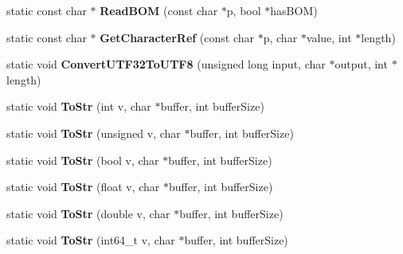 \begin{DoxyCompactItemize}
\item 
static const char $\ast$ {\bfseries Read\+B\+OM} (const char $\ast$p, bool $\ast$has\+B\+OM)\hypertarget{classtinyxml2_1_1XMLUtil_ae9bcb2bc3cd6475fdc644c8c17790555}{}\label{classtinyxml2_1_1XMLUtil_ae9bcb2bc3cd6475fdc644c8c17790555}

\item 
static const char $\ast$ {\bfseries Get\+Character\+Ref} (const char $\ast$p, char $\ast$value, int $\ast$length)\hypertarget{classtinyxml2_1_1XMLUtil_a5a96e5144a8d693dc4bcd783d9964648}{}\label{classtinyxml2_1_1XMLUtil_a5a96e5144a8d693dc4bcd783d9964648}

\item 
static void {\bfseries Convert\+U\+T\+F32\+To\+U\+T\+F8} (unsigned long input, char $\ast$output, int $\ast$length)\hypertarget{classtinyxml2_1_1XMLUtil_a31c00d5c5dfb38382de1dfcaf4be3595}{}\label{classtinyxml2_1_1XMLUtil_a31c00d5c5dfb38382de1dfcaf4be3595}

\item 
static void {\bfseries To\+Str} (int v, char $\ast$buffer, int buffer\+Size)\hypertarget{classtinyxml2_1_1XMLUtil_a3cd6c703d49b9d51bdf0f4ff6aa021c7}{}\label{classtinyxml2_1_1XMLUtil_a3cd6c703d49b9d51bdf0f4ff6aa021c7}

\item 
static void {\bfseries To\+Str} (unsigned v, char $\ast$buffer, int buffer\+Size)\hypertarget{classtinyxml2_1_1XMLUtil_ac00c2e52c1c36dab3ff41d86a9bf60f9}{}\label{classtinyxml2_1_1XMLUtil_ac00c2e52c1c36dab3ff41d86a9bf60f9}

\item 
static void {\bfseries To\+Str} (bool v, char $\ast$buffer, int buffer\+Size)\hypertarget{classtinyxml2_1_1XMLUtil_adba0718527ae9e80f663a71ea325cb11}{}\label{classtinyxml2_1_1XMLUtil_adba0718527ae9e80f663a71ea325cb11}

\item 
static void {\bfseries To\+Str} (float v, char $\ast$buffer, int buffer\+Size)\hypertarget{classtinyxml2_1_1XMLUtil_a8957ad44fee5fa02ba52d73aad4d0a31}{}\label{classtinyxml2_1_1XMLUtil_a8957ad44fee5fa02ba52d73aad4d0a31}

\item 
static void {\bfseries To\+Str} (double v, char $\ast$buffer, int buffer\+Size)\hypertarget{classtinyxml2_1_1XMLUtil_a1cd141e50980fcddd6bf9af5de4b1db7}{}\label{classtinyxml2_1_1XMLUtil_a1cd141e50980fcddd6bf9af5de4b1db7}

\item 
static void {\bfseries To\+Str} (int64\+\_\+t v, char $\ast$buffer, int buffer\+Size)\hypertarget{classtinyxml2_1_1XMLUtil_a26a8cb5b833ad587b3af39469c8111de}{}\label{classtinyxml2_1_1XMLUtil_a26a8cb5b833ad587b3af39469c8111de}


\end{DoxyCompactItemize}
